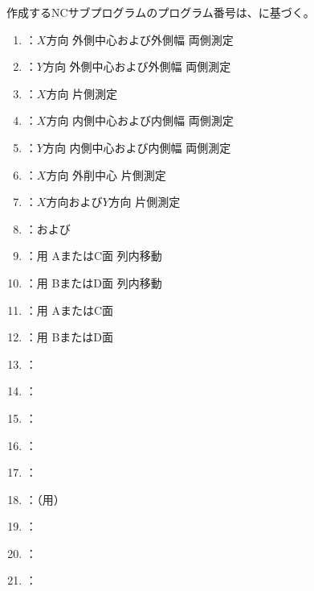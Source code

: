 

作成するNCサブプログラムのプログラム番号は、に基づく。



\begin{enumerate}[label*=\sarrow]
\item \MXOThickness：$X$方向 外側中心および外側幅 両側測定
\item \MYOThickness：$Y$方向 外側中心および外側幅 両側測定
\item \MXOface：$X$方向 \KeywayCenter{} 片側測定
\item \MXIWidth：$X$方向 内側中心および内側幅 両側測定
\item \MYIWidth：$Y$方向 内側中心および内側幅 両側測定
\item \MXIface：$X$方向 外削中心 片側測定
\item \MCenterline：$X$方向および$Y$方向 \CenterlineEndFaceDif{} 片側測定
\item \DLone：\DimpleMeasurement および\DimpleMilling
\item \DLtwoAC：\DLone 用 AまたはC面 \Dimple 列内移動
\item \DLtwoBD：\DLone 用 BまたはD面 \Dimple 列内移動
\item \DMLthreeAC：\DLtwoAC 用 AまたはC面 \DimpleMeasurement
\item \DMLthreeBD：\DLtwoBD 用 BまたはD面 \DimpleMeasurement
\item \KEndFaceRight：\EndFacecutMilling
\item \KOutcutRLeft：\OutcutMilling
\item \KCurvedOutcutRLeft：\CurvedOutcutMilling
\item \KKeywayConerLeft：\KeywayMilling
\item \KEndFaceOutCChamferRLeft：\EndFaceOutCChamferMilling
\item \KEndFaceCurvedOutCChamferRLeft：\EndFaceOutCChamferMilling（\CurvedOutcut 用）
\item \KEndFaceInCChamferRLeft：\EndFaceInCChamferMilling
\item \KEndFaceBoring：\EndFaceBoringMilling
\item \KIncutBoring：\IncutBoringMilling

\end{enumerate}
